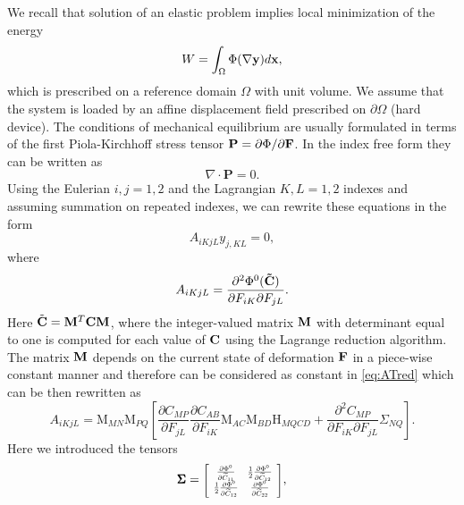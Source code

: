 \documentclass[CRPHYS,Unicode,manuscript]{cedram}
\begin{document}
We recall that  solution of an  elastic  problem implies  local  minimization of  the energy $$W=\int_{\Omega}\Phi(\nabla\bold y ) d\bold x, $$ which is prescribed  on  a  reference domain  $\Omega$ with unit volume. We assume that the system is  loaded  by  an affine displacement field prescribed  on $\partial \Omega$ (hard device).  The conditions of mechanical equilibrium  are usually formulated in terms  of the first Piola-Kirchhoff stress tensor ${\bf P}= \partial\Phi/{\partial\bf F} $. In the index free form they can be written as  
$$
\nabla\cdot\mathbf{P}=0.  
$$
Using the Eulerian   $i,j=1,2$ and the Lagrangian  $K,L =1,2$ indexes and assuming summation on repeated indexes, we can rewrite  these equations  in the form
$$
A_{iKjL} y_{j,KL}=0,
$$
where  
 \begin{equation}A_{iKjL}= \frac{\partial^2\Phi^0{({\bf\tilde C})}}{\partial F_{iK}\partial F_{jL}}.
 \label{eq:ATred}
 \end{equation}
Here  $\tilde{\bf C}=\bold M^T\bold C\bold M$, where the integer-valued matrix $\bold M$  with determinant equal to one is computed for each value of $\bold C$ using the Lagrange reduction algorithm.  The matrix ${\bf M}$ depends on the current state of deformation $\bf F$ in a piece-wise constant manner and  therefore can be considered as constant in \eqref{eq:ATred} which can be then rewritten as 
 \begin{equation} \label{compact}
A_{iKjL}=\text{M}_{MN} \text{M}_{PQ} \left[ 
\frac{\partial C_{MP}}{\partial F_{jL}} \frac{\partial C_{AB}}{\partial F_{iK}}\text{M}_{AC}\text{M}_{BD}  \text{H}_{MQCD}+\frac{\partial ^2C_{MP}}{\partial F_{iK}\partial F_{jL}}   \Sigma_{NQ} 
 \right].
\end{equation}
Here  we   introduced the tensors  
%
\begin{equation}
\label{eqn:Phi}
{\pmb \Sigma}= \scalebox{.75}{$
\left[\begin{array}{cc}
\frac{\partial\Phi^{0}}{\partial\widetilde{C}_{11}} & \frac{1}{2}\frac{\partial\Phi^{0}}{\partial\widetilde{C}_{12}}\\
\frac{1}{2}\frac{\partial\Phi^{0}}{\partial\widetilde{C}_{12}} & \frac{\partial\Phi^{0}}{\partial\widetilde{C}_{22}}
\end{array}\right]$},
\end{equation}
\end{document}
